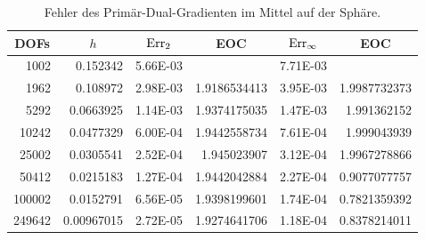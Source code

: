 \begin{beispiel}[Sphäre]
      \begin{table}[htbp]
       \centering
       \begin{tabular}{|r|r|r|r|r|r|}
       \hline
       \multicolumn{1}{|c|}{DOFs} & \multicolumn{1}{c|}{\( h \)} & \multicolumn{1}{c|}{\( \text{Err}_{2} \)} & \multicolumn{1}{c|}{EOC} &
       \multicolumn{1}{c|}{ \( \text{Err}_{\infty} \)} & \multicolumn{1}{c|}{EOC} \\ \hline
       1002 & 0.152342 & 5.66E-03 & \multicolumn{1}{l|}{} & 7.71E-03 & \multicolumn{1}{l|}{} \\ \hline
        1962 & 0.108972 & 2.98E-03 & 1.9186534413 & 3.95E-03 & 1.9987732373 \\ \hline
        5292 & 0.0663925 & 1.14E-03 & 1.9374175035 & 1.47E-03 & 1.991362152 \\ \hline
        10242 & 0.0477329 & 6.00E-04 & 1.9442558734 & 7.61E-04 & 1.999043939 \\ \hline
        25002 & 0.0305541 & 2.52E-04 & 1.945023907 & 3.12E-04 & 1.9967278866 \\ \hline
        50412 & 0.0215183 & 1.27E-04 & 1.9442042884 & 2.27E-04 & 0.9077077757 \\ \hline
        100002 & 0.0152791 & 6.56E-05 & 1.9398199601 & 1.74E-04 & 0.7821359392 \\ \hline
        249642 & 0.00967015 & 2.72E-05 & 1.9274641706 & 1.18E-04 & 0.8378214011 \\ \hline
       \end{tabular}
       \caption[Gradient auf Sphäre]{Fehler des Primär-Dual-Gradienten im Mittel auf der Sphäre.}
       \label{tabGradSphere}
      \end{table}
    \end{beispiel}

